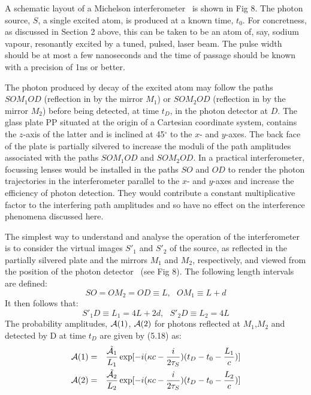 {  \par A schematic layout of a Michelson interferometer~\cite{JW1} is shown in Fig 8.
    The photon source, $S$,
   a single excited atom, is produced at a known time, $t_0$. For concretness, as discussed in Section 2 above, this can be
  taken to be an atom of, say, sodium vapour, resonantly excited by a tuned, pulsed, laser beam.
   The pulse width should be at most a few nanoseconds and the time of passage should be known with a precision
  of 1ns or better.
  \par The photon produced by decay of the excited atom may follow the paths $SOM_1OD$ (reflection in by the
    mirror $M_1$) or $SOM_2OD$ (reflection in by the mirror $M_2$) before being detected, at time $t_D$, in the 
   photon detector at $D$. The glass plate PP situated at the origin of a Cartesian coordinate system,
   contains the $z$-axis of the latter and is inclined at 45$^{\circ}$ to the $x$- and $y$-axes. The back face
   of the plate is partially silvered to increase the moduli of the path amplitudes associated with
   the paths  $SOM_1OD$ and  $SOM_2OD$. In a practical interferometer, focussing lenses would be installed in
    the paths $SO$ and $OD$ to render the photon trajectories in the interferometer parallel to the $x$- and
    $y$-axes and increase the efficiency of photon detection. They would contribute a constant multiplicative
    factor to the interfering path amplitudes and so have no effect on the interference phenomena 
    discussed here. 
    \par The simplest way to understand and analyse the operation of the interferometer is to consider the virtual
   images $S'_1$ and $S'_2$ of the source, as reflected in the partially silvered plate and the mirrors
    $M_1$ and $M_2$, respectively, and viewed from the position of the photon detector~\cite{JW1} (see Fig 8).
    The following length intervals are defined:
    \[ SO = OM_2 = OD \equiv L,~~~OM_1 \equiv L+d  \]
    It then follows that:
    \[ S'_1D \equiv L_1 = 4L+2d,~~~S'_2D \equiv L_2 = 4L \]
     The probability amplitudes, ${\cal A}(1)$, ${\cal A}(2)$ for photons reflected at $M_1$,$M_2$ and detected 
     by D at time $t_D$ are given by (5.18) as:
     \begin{eqnarray}
   {\cal A}(1) & = & \frac{\tilde{{\cal A}_1}}{L_1} \exp[-i(\kappa c- \frac{i}{2 \tau_S})(t_D-t_0-\frac{L_1}{c})] \\
  {\cal A}(2) & = & \frac{\tilde{{\cal A}_2}}{L_2} \exp[-i(\kappa c- \frac{i}{2 \tau_S})(t_D-t_0-\frac{L_2}{c})]
    \end{eqnarray}
}
